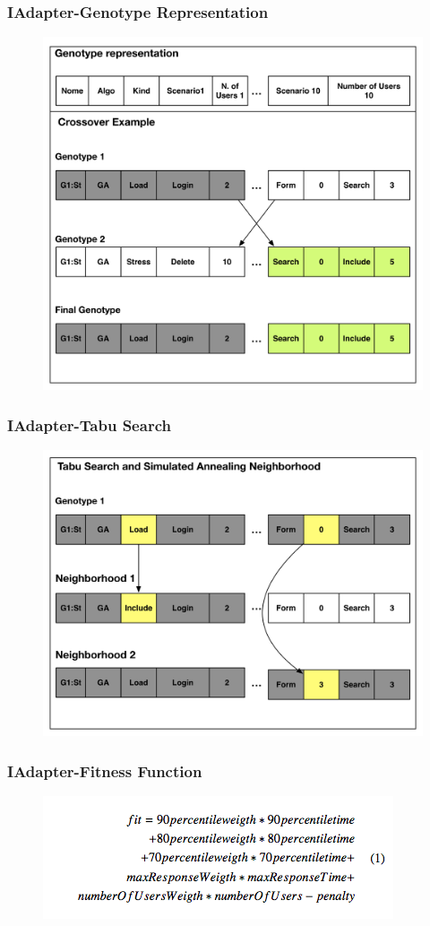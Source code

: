 \documentclass{beamer}
\begin{document}
\begin{frame}
\frametitle{IAdapter-Genotype Representation}
\begin{figure}[H]
\centering
\includegraphics[width=0.7\linewidth]{genomerepresentation.png}
\end{figure}
\end{frame}

\begin{frame}
\frametitle{IAdapter-Tabu Search}
\begin{figure}[H]
\centering
\includegraphics[width=0.7\linewidth]{TabuNE.png}
\end{figure}
\end{frame}

\begin{frame}
\frametitle{IAdapter-Fitness Function}
\begin{figure}[H]
\centering
\includegraphics[width=1.1\linewidth]{fit1.png}
\end{figure}
\end{frame}
\end{document}
